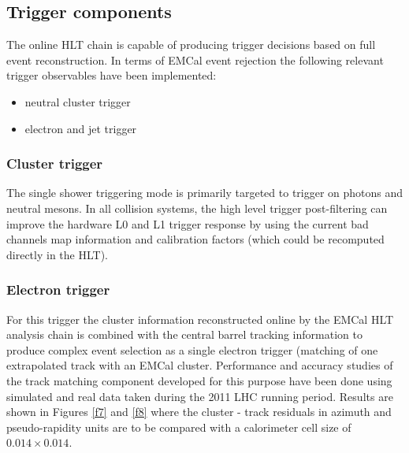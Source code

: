 \subsection{Trigger components}

The online HLT chain is capable of producing trigger decisions based on full
event reconstruction. In terms of EMCal event rejection the following relevant trigger observables
have been implemented:

\begin{itemize}
\item neutral cluster trigger
\item electron and jet trigger
\end{itemize}


\subsubsection{Cluster trigger} 
The single shower triggering mode is primarily targeted to trigger on photons and neutral mesons.
In all collision systems, the high level trigger post-filtering can improve  
the hardware L0 and L1 trigger response by using the current bad channels map information
and calibration factors (which could be recomputed directly in the HLT).

\subsubsection{Electron trigger}
For this trigger  the cluster information reconstructed online by the EMCal HLT analysis 
chain is combined with the central barrel tracking information to produce complex event selection 
as a single electron trigger (matching of one extrapolated track with an EMCal cluster.
Performance and accuracy studies of the track matching component developed for this purpose 
have been done using simulated and real data taken during the 2011 LHC running period. 
Results are shown in Figures \ref{f7} and \ref{f8} where the cluster - track residuals
in azimuth and pseudo-rapidity units are to be compared with a calorimeter cell size of 
$0.014\times 0.014$.

